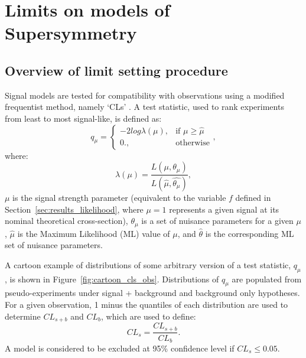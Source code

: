 \section{Limits on models of Supersymmetry}  %
\label{sec:interpretation_limits}

\subsection{Overview of limit setting procedure}
Signal models are tested for compatibility with observations using
a modified frequentist method, namely `CLs' \cite{alread-cls}. A test statistic,
used to rank
experiments from least to most signal-like, is defined as:
% 
\begin{equation}
q_{\mu} = \begin{cases} -2log\lambda(\mu), & \mbox{if } \mu \geq \hat{\mu} \\
0., & \mbox{otherwise} \end{cases},
\end{equation}
% 
where:
% 
\begin{equation}
\lambda(\mu) = \frac{L(\mu, \theta_{\mu})}{L(\hat{\mu}, \hat{\theta_{\mu}})},
\end{equation}
% 
$\mu$ is the signal strength parameter (equivalent to the variable $f$ defined
in Section~\ref{sec:results_likelihood}, where $\mu=1$ represents a given
signal at its nominal theoretical cross-section), $\theta_{\mu}$ is a set of
nuisance parameters for a given $\mu$, $\hat {\mu}$ is the Maximum Likelihood
(ML) value of $\mu$, and $\hat{\theta}$ is the corresponding ML set of nuisance
parameters.

A cartoon example of distributions of some arbitrary version of a test statistic, $q_{\mu}$, is
shown in Figure~\ref{fig:cartoon_cls_obs}. 
Distributions of $q_{\mu}$ are populated from pseudo-experiments under
signal + background and background only hypotheses. For a given observation, 1
minus the quantiles of each distribution are used to determine $CL_{s+b}$ and
$CL_b$, which are used to define:
% 
\begin{equation}
CL_s = \frac{CL_{s+b}}{CL_b}.
\end{equation}
% 
A model is considered to be excluded at 95\% confidence level if
$CL_s \leq 0.05$.

